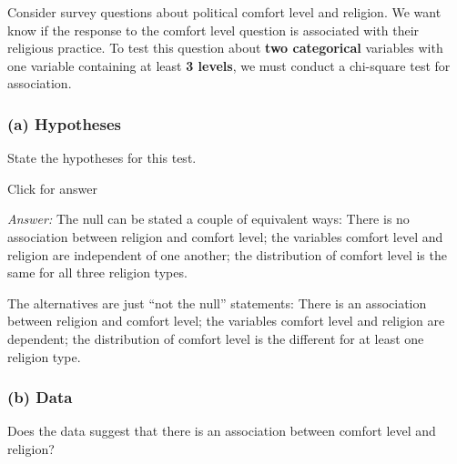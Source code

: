 \documentclass[
]{book}
\begin{document}
Consider survey questions about political comfort level and religion. We want know if the response to the comfort level question is associated with their religious practice. To test this question about \textbf{two categorical} variables with one variable containing at least \textbf{3 levels}, we must conduct a chi-square test for association.

\hypertarget{a-hypotheses}{%
\subsubsection{(a) Hypotheses}\label{a-hypotheses}}

State the hypotheses for this test.

Click for answer

\emph{Answer:} The null can be stated a couple of equivalent ways: There is no association between religion and comfort level; the variables comfort level and religion are independent of one another; the distribution of comfort level is the same for all three religion types.

The alternatives are just ``not the null'' statements: There is an association between religion and comfort level; the variables comfort level and religion are dependent; the distribution of comfort level is the different for at least one religion type.

\hypertarget{b-data}{%
\subsubsection{(b) Data}\label{b-data}}

Does the data suggest that there is an association between comfort level and religion?
\end{document}
